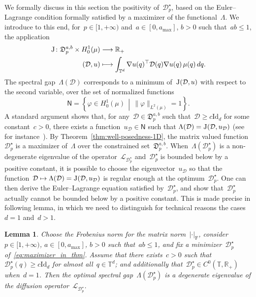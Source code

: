 \documentclass{article}
\newtheorem{lemma}{Lemma}
\newcommand{\R}{\mathbb{R}}
\newcommand{\Id}{\mathrm{Id}}
\renewcommand{\leq}{\leqslant}
\renewcommand{\geq}{\geqslant}
\def\R{\mathbb{R}}
\def\T{\mathbb{T}}
\newcommand{\Diff}{\mathcal{D}}
\newcommand{\Diffset}{\mathfrak{D}}
\newcommand{\F}{\mathrm{F}}
\newcommand{\normF}[1]{\left| #1 \right|_{\F}}
\renewcommand{\dim}{d}
\begin{document}
We formally discuss in this section the positivity of~$\Diff^{\star}_p$, based on the Euler--Lagrange condition formally satisfied by a maximizer of the functional~$\Lambda$. We introduce to this end, for~$p \in [1,+\infty)$ and~$a \in [0,a_\mathrm{max}]$, $b>0$ such that~$ab \leq 1$, the application 
\begin{align}
  \textsc{J} \colon  \Diffset_p^{a,b} \times H^1_0(\mu)&\longrightarrow \R_+  \\
  ( \Diff, u) &\longmapsto \int_{\T^\dim} \nabla u(q)^\top \Diff(q) \nabla u(q) \, \mu(q)\,dq.
\end{align}
The spectral gap~$\Lambda(\Diff)$ corresponds to a minimum of~$\textsc{J}(\Diff,u)$ with respect to the second variable, over the set of normalized functions
\[
\textsf{N} = \left\{\varphi \in H^1_0(\mu) \, \middle| \,\|\varphi\|_{L^2(\mu)}= 1 \right\}.
\]
A standard argument shows that, for any~$\Diff \in \Diffset_p^{a,b}$ such that~$\Diff \geq c \Id_\dim$ for some constant~$c>0$, there exists a function~$u_{\Diff}\in\textsf{N}$ such that $\Lambda(\Diff) = \textsc{J}(\Diff, u_{\Diff})$ (see for instance~\cite[Chapter~1]{Henrot}). By Theorem~\ref{thm:well-posedness-1D}, the matrix valued function~$\Diff^{\star}_p$ is a maximizer of~$\Lambda$ over the constrained set~$\Diffset_p^{a,b}$. When~$\Lambda(\Diff^\star_p)$ is a non-degenerate eigenvalue of the operator~$\mathcal{L}_{\Diff^\star_p}$ and~$\Diff^{\star}_p$ is bounded below by a positive constant, it is possible to choose the eigenvector~$u_\Diff$ so that the function~$\Diff \mapsto \Lambda(\Diff) = \textsc{J}(\Diff, u_{\Diff})$ is regular enough at the optimum~$\Diff^{\star}_p$. One can then derive the Euler--Lagrange equation satisfied by~$\Diff^{\star}_p$, and show that~$\Diff^{\star}_p$ actually cannot be bounded below by a positive constant. This is made precise in  following lemma, in which we need to distinguish for technical reasons the cases~$\dim=1$ and~$\dim>1$.

\begin{lemma}
  \label{lem:EL}
  Choose the Frobenius norm for the matrix norm~$\normF{\cdot}$, consider~$p \in [1,+\infty)$, $a \in [0,a_\mathrm{max}]$, $b>0$ such that~$ab \leq 1$, and fix a minimizer~$\Diff^\star_p$ of~\eqref{eq:maximizer_in_thm}. Assume that there exists~$c>0$ such that~$\Diff_p^{\star}(q)\geq c \Id_\dim$ for almost all~$q\in\T^\dim$; and additionally that~$\Diff_p^{\star} \in C^0(\T,\R_+)$ when~$\dim=1$. Then the optimal spectral gap~$\Lambda(\Diff_p^{\star})$ is a degenerate eigenvalue of the diffusion operator~$\mathcal{L}_{\Diff^\star_p}$.
\end{lemma}
\end{document}
